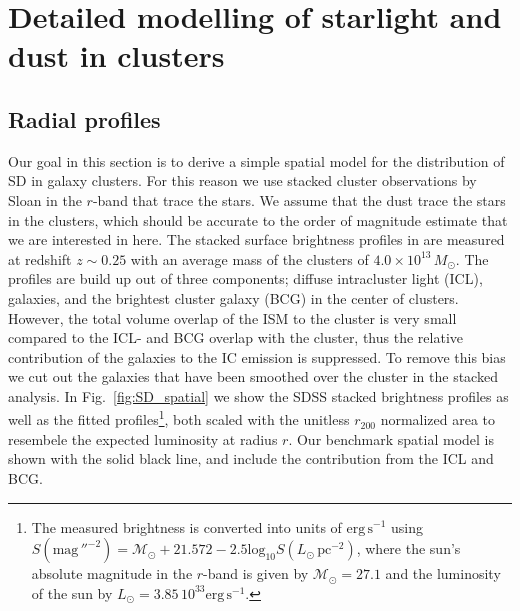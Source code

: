 \documentclass[10pt,aps,pra,reprint,amsmath,amsfonts,amssymb,showpacs]{revtex4-1}
\newcommand{\rmn}{\mathrm}
\newcommand{\msun}{M_\odot}
\newcommand{\rvir}{r_{200}}
\begin{document}
\vspace{-0.7cm}

%
%

\appendix

\section{Detailed modelling of  starlight and dust in clusters}

\subsection{Radial profiles}

Our goal in this section is to derive a simple spatial model for the
distribution of SD in galaxy clusters. For this reason we use stacked cluster
observations by Sloan in the $r$-band that trace the stars. We assume that the
dust trace the stars in the clusters, which should be accurate to the order of
magnitude estimate that we are interested in here. The stacked surface
brightness profiles in \cite{2005MNRAS.358..949Z} are measured at redshift $z
\sim 0.25$ with an average mass of the clusters of
$4.0\times10^{13}\,\msun$. The profiles are build up out of three components;
diffuse intracluster light (ICL), galaxies, and the brightest cluster galaxy
(BCG) in the center of clusters. However, the total volume overlap of the ISM to
the cluster is very small compared to the ICL- and BCG overlap with the cluster,
thus the relative contribution of the galaxies to the IC emission is
suppressed. To remove this bias we cut out the galaxies that have been smoothed
over the cluster in the stacked analysis. In Fig.~\ref{fig:SD_spatial} we show
the SDSS stacked brightness profiles as well as the fitted profiles\footnote{The
  measured brightness is converted into units of $\rmn{erg}\,\rmn{s}^{-1}$ using
  \cite{2010...book} $S(\rmn{mag}\,''^{-2}) =
  \mathcal{M}_\odot+21.572-2.5\rmn{log}_{10}S(L_\odot\,\rmn{pc}^{-2})$, where
  the sun's absolute magnitude in the $r$-band is given by
  $\mathcal{M}_\odot=27.1$ \cite{1998gaas.book.....B} and the luminosity of the
  sun by $L_\odot=3.85\,10^{33} \rmn{erg}\,\rmn{s}^{-1}$.}, both scaled with the
unitless $\rvir$ normalized area to resembele the expected luminosity at radius
$r$. Our benchmark spatial model is shown with the solid black line, and include
the contribution from the ICL and BCG.
\end{document}

